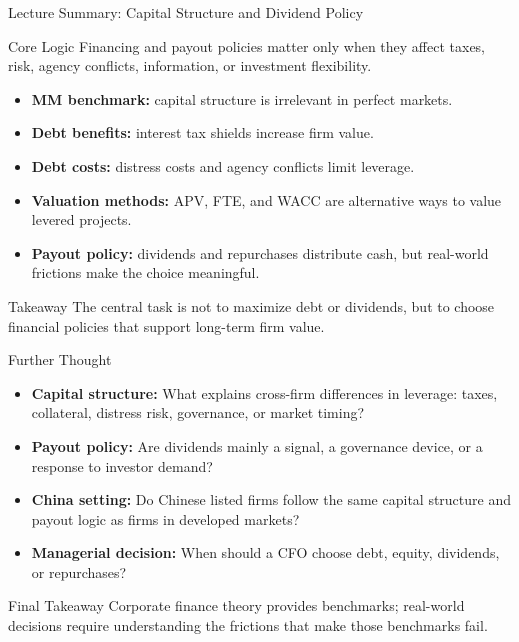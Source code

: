 \documentclass[xcolor=table]{beamer}
\begin{document}
\begin{frame}{Lecture Summary: Capital Structure and Dividend Policy}

\begin{block}{Core Logic}
Financing and payout policies matter only when they affect taxes, risk,
agency conflicts, information, or investment flexibility.
\end{block}

\vspace{0.3cm}

\begin{itemize}
    \item \textbf{MM benchmark:} capital structure is irrelevant in perfect markets.
    \item \textbf{Debt benefits:} interest tax shields increase firm value.
    \item \textbf{Debt costs:} distress costs and agency conflicts limit leverage.
    \item \textbf{Valuation methods:} APV, FTE, and WACC are alternative ways to value levered projects.
    \item \textbf{Payout policy:} dividends and repurchases distribute cash, but real-world frictions make the choice meaningful.
\end{itemize}

\vfill

\begin{alertblock}{Takeaway}
The central task is not to maximize debt or dividends, but to choose financial
policies that support long-term firm value.
\end{alertblock}

\end{frame}

\begin{frame}{Further Thought}

\begin{itemize}
    \item \textbf{Capital structure:}
    What explains cross-firm differences in leverage: taxes, collateral,
    distress risk, governance, or market timing?

    \item \textbf{Payout policy:}
    Are dividends mainly a signal, a governance device, or a response to
    investor demand?

    \item \textbf{China setting:}
    Do Chinese listed firms follow the same capital structure and payout logic
    as firms in developed markets?

    \item \textbf{Managerial decision:}
    When should a CFO choose debt, equity, dividends, or repurchases?
\end{itemize}

\vfill

\begin{alertblock}{Final Takeaway}
Corporate finance theory provides benchmarks; real-world decisions require
understanding the frictions that make those benchmarks fail.
\end{alertblock}

\end{frame}
\end{document}

